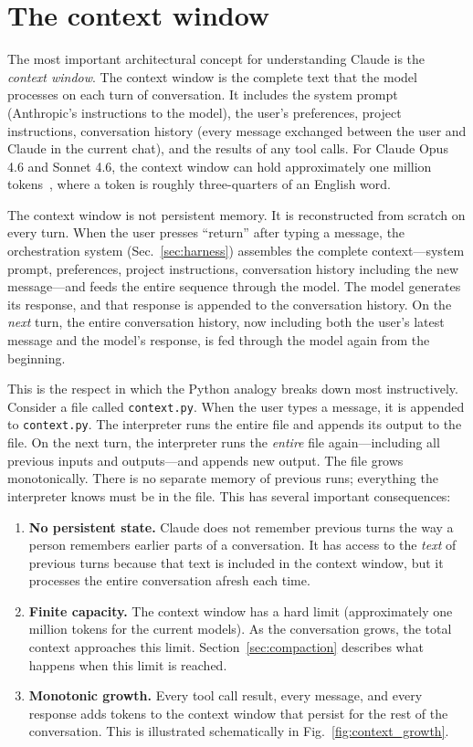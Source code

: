 \documentclass[12pt]{article}
\begin{document}
\section{The context window}
\label{sec:context}

The most important architectural concept for understanding Claude is the \emph{context window}. The context window is the complete text that the model processes on each turn of conversation. It includes the system prompt (Anthropic's instructions to the model), the user's preferences, project instructions, conversation history (every message exchanged between the user and Claude in the current chat), and the results of any tool calls. For Claude Opus 4.6 and Sonnet 4.6, the context window can hold approximately one million tokens~\cite{anthropic_api_docs}, where a token is roughly three-quarters of an English word.

The context window is not persistent memory. It is reconstructed from scratch on every turn. When the user presses ``return'' after typing a message, the orchestration system (Sec.~\ref{sec:harness}) assembles the complete context---system prompt, preferences, project instructions, conversation history including the new message---and feeds the entire sequence through the model. The model generates its response, and that response is appended to the conversation history. On the \emph{next} turn, the entire conversation history, now including both the user's latest message and the model's response, is fed through the model again from the beginning.

This is the respect in which the Python analogy breaks down most instructively. Consider a file called \texttt{context.py}. When the user types a message, it is appended to \texttt{context.py}. The interpreter runs the entire file and appends its output to the file. On the next turn, the interpreter runs the \emph{entire} file again---including all previous inputs and outputs---and appends new output. The file grows monotonically. There is no separate memory of previous runs; everything the interpreter knows must be in the file. This has several important consequences:

\begin{enumerate}
\item \textbf{No persistent state.} Claude does not remember previous turns the way a person remembers earlier parts of a conversation. It has access to the \emph{text} of previous turns because that text is included in the context window, but it processes the entire conversation afresh each time.

\item \textbf{Finite capacity.} The context window has a hard limit (approximately one million tokens for the current models). As the conversation grows, the total context approaches this limit. Section~\ref{sec:compaction} describes what happens when this limit is reached.

\item \textbf{Monotonic growth.} Every tool call result, every message, and every response adds tokens to the context window that persist for the rest of the conversation. This is illustrated schematically in Fig.~\ref{fig:context_growth}.
\end{enumerate}
\end{document}
